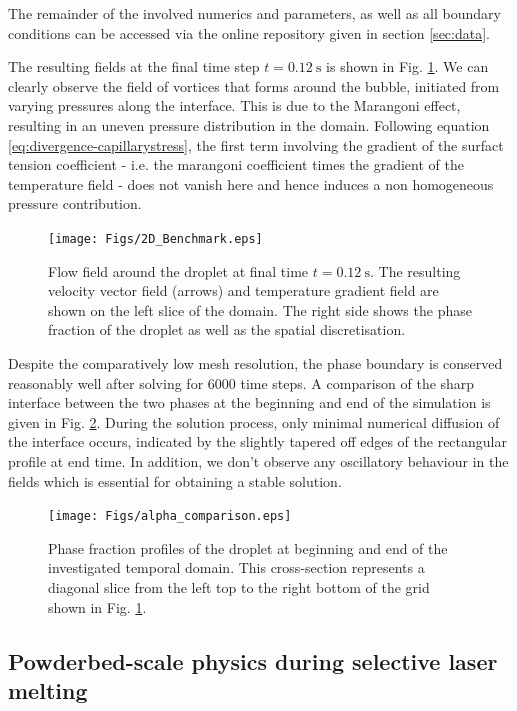 \documentclass[conference,final,a4paper]{IEEEtran}
\begin{document}
The remainder of the involved numerics and parameters, as well as all boundary conditions can be accessed via the online repository given in section \ref{sec:data}.

The resulting fields at the final time step $t = \SI{0.12}{\second}$ is shown in Fig. \ref{fig:2d-benchmark}. We can clearly observe the field of vortices that forms around the bubble, initiated from varying pressures along the interface. This is due to the Marangoni effect, resulting in an uneven pressure distribution in the domain. Following equation \ref{eq:divergence-capillarystress}, the first term involving the gradient of the surfact tension coefficient - i.e. the marangoni coefficient times the gradient of the temperature field - does not vanish here and hence induces a non homogeneous pressure contribution.

\begin{figure}[!tbp]
  \centering
  \texttt{[image: Figs/2D\_Benchmark.eps]}
  \caption{Flow field around the droplet at final time $t = \SI{0.12}{\second}$. The resulting velocity vector field (arrows) and temperature gradient field are shown on the left slice of the domain. The right side shows the phase fraction of the droplet as well as the spatial discretisation.}
  \label{fig:2d-benchmark}
\end{figure}

Despite the comparatively low mesh resolution, the phase boundary is conserved reasonably well after solving for 6000 time steps. A comparison of the sharp interface between the two phases at the beginning and end of the simulation is given in Fig. \ref{fig:alpha-comparison}. During the solution process, only minimal numerical diffusion of the interface occurs, indicated by the slightly tapered off edges of the rectangular profile at end time. In addition, we don't observe any oscillatory behaviour in the fields which is essential for obtaining a stable solution.

\begin{figure}[!tbp]
  \centering
  \texttt{[image: Figs/alpha\_comparison.eps]}
  \caption{Phase fraction profiles of the droplet at beginning and end of the investigated temporal domain. This cross-section represents a diagonal slice from the left top to the right bottom of the grid shown in Fig. \ref{fig:2d-benchmark}.}
  \label{fig:alpha-comparison}
\end{figure}

\subsection{Powderbed-scale physics during selective laser melting}\label{sec:lpbf}
\end{document}
